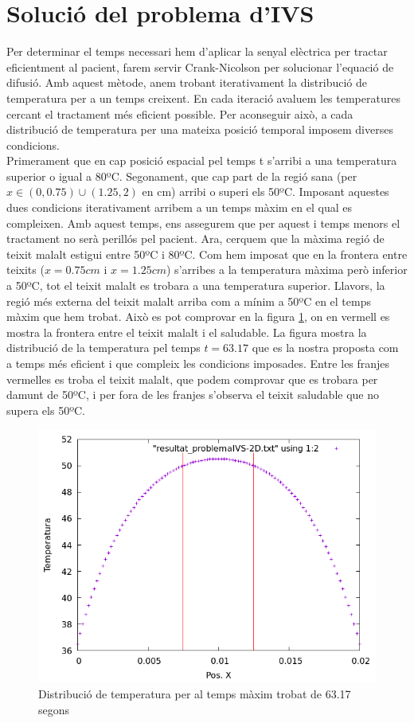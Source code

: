 \documentclass{article}
\begin{document}
\section{Solució del problema d'IVS}
Per determinar el temps necessari hem d'aplicar la senyal elèctrica per tractar eficientment al pacient, farem servir Crank-Nicolson per solucionar l'equació de difusió. Amb aquest mètode, anem trobant iterativament la distribució de temperatura per a un temps creixent. En cada iteració avaluem les temperatures cercant el tractament més eficient possible. Per aconseguir això, a cada distribució de temperatura per una mateixa posició temporal imposem diverses condicions. \\ Primerament que en cap posició espacial pel temps t s'arribi a una temperatura superior o igual a 80ºC. Segonament, que cap part de la regió sana (per $x\in(0,0.75) \cup (1.25,2)$ en cm) arribi o superi els 50ºC. Imposant aquestes dues condicions iterativament arribem a un temps màxim en el qual es compleixen. Amb aquest temps, ens assegurem que per aquest i temps menors el tractament no serà perillós pel pacient. Ara, cerquem que la màxima regió de teixit malalt estigui entre 50ºC i 80ºC. Com hem imposat que en la frontera entre teixits ($x =0.75cm$ i $x=1.25cm$) s'arribes a la temperatura màxima però inferior a 50ºC, tot el teixit malalt es trobara a una temperatura superior. Llavors, la regió més externa del teixit malalt arriba com a mínim a 50ºC en el temps màxim que hem trobat. Això es pot comprovar en la figura \ref{fig:solucion_ivs}, on en vermell es mostra la frontera entre el teixit malalt i el saludable. La figura mostra la distribució de la temperatura pel temps $t =  63.17$ que es la nostra proposta com a temps més eficient i que compleix les condicions imposades. Entre les franjes vermelles es troba el teixit malalt, que podem comprovar que es trobara per damunt de 50ºC, i per fora de les franjes s'observa el teixit saludable que no supera els 50ºC.

\begin{figure}[h]
    \centering
    \includegraphics[width=0.5\linewidth]{images/solucion_IVS-2D.png}
    \caption{Distribució de temperatura per al temps màxim trobat de 63.17 segons}
    \label{fig:solucion_ivs}
\end{figure}
\end{document}
